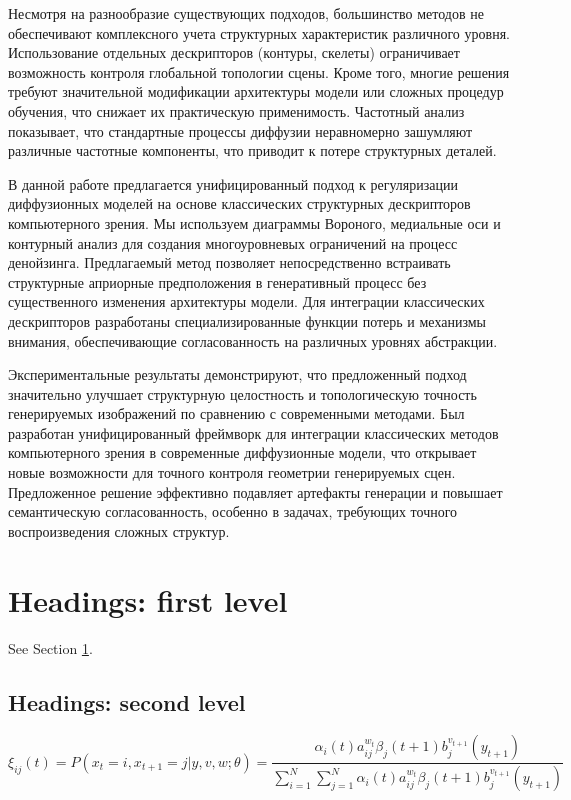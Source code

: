 \documentclass{article}
\begin{document}
Несмотря на разнообразие существующих подходов, большинство методов не обеспечивают комплексного учета структурных характеристик различного уровня. Использование отдельных дескрипторов (контуры, скелеты) ограничивает возможность контроля глобальной топологии сцены. Кроме того, многие решения требуют значительной модификации архитектуры модели или сложных процедур обучения, что снижает их практическую применимость. Частотный анализ~\cite{falck2025fourierspaceperspectivediffusion} показывает, что стандартные процессы диффузии неравномерно зашумляют различные частотные компоненты, что приводит к потере структурных деталей.

В данной работе предлагается унифицированный подход к регуляризации диффузионных моделей на основе классических структурных дескрипторов компьютерного зрения. Мы используем диаграммы Вороного, медиальные оси и контурный анализ для создания многоуровневых ограничений на процесс денойзинга. Предлагаемый метод позволяет непосредственно встраивать структурные априорные предположения в генеративный процесс без существенного изменения архитектуры модели. Для интеграции классических дескрипторов разработаны специализированные функции потерь и механизмы внимания, обеспечивающие согласованность на различных уровнях абстракции.

Экспериментальные результаты демонстрируют, что предложенный подход значительно улучшает структурную целостность и топологическую точность генерируемых изображений по сравнению с современными методами. Был разработан унифицированный фреймворк для интеграции классических методов компьютерного зрения в современные диффузионные модели, что открывает новые возможности для точного контроля геометрии генерируемых сцен. Предложенное решение эффективно подавляет артефакты генерации и повышает семантическую согласованность, особенно в задачах, требующих точного воспроизведения сложных структур.

\section{Headings: first level}
\label{sec:headings}

\lipsum[4] See Section \ref{sec:headings}.

\subsection{Headings: second level}
\lipsum[5]
\begin{equation}
	\xi _{ij}(t)=P(x_{t}=i,x_{t+1}=j|y,v,w;\theta)= {\frac {\alpha _{i}(t)a^{w_t}_{ij}\beta _{j}(t+1)b^{v_{t+1}}_{j}(y_{t+1})}{\sum _{i=1}^{N} \sum _{j=1}^{N} \alpha _{i}(t)a^{w_t}_{ij}\beta _{j}(t+1)b^{v_{t+1}}_{j}(y_{t+1})}}
\end{equation}
\end{document}
